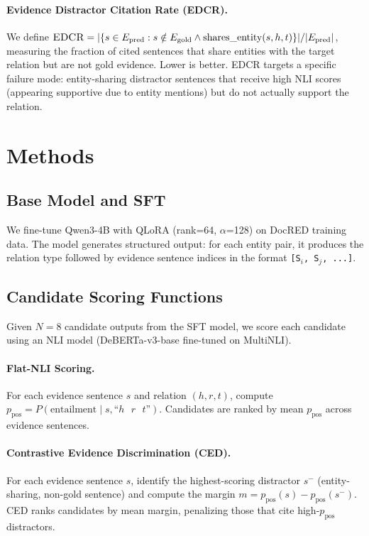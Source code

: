 \documentclass[11pt,a4paper]{article}
\newcommand{\edcr}{\textsc{EDCR}}
\begin{document}
\paragraph{Evidence Distractor Citation Rate (\edcr{}).}
We define $\edcr{} = |\{s \in E_\text{pred} : s \notin E_\text{gold} \wedge \text{shares\_entity}(s, h, t)\}| / |E_\text{pred}|$, measuring the fraction of cited sentences that share entities with the target relation but are not gold evidence. Lower is better. \edcr{} targets a specific failure mode: entity-sharing distractor sentences that receive high NLI scores (appearing supportive due to entity mentions) but do not actually support the relation.

\section{Methods}
\label{sec:methods}

\subsection{Base Model and SFT}

We fine-tune Qwen3-4B with QLoRA (rank=64, $\alpha$=128) on DocRED training data. The model generates structured output: for each entity pair, it produces the relation type followed by evidence sentence indices in the format \texttt{[S$_i$, S$_j$, ...]}.

\subsection{Candidate Scoring Functions}

Given $N{=}8$ candidate outputs from the SFT model, we score each candidate using an NLI model (DeBERTa-v3-base fine-tuned on MultiNLI).

\paragraph{Flat-NLI Scoring.}
For each evidence sentence $s$ and relation $(h, r, t)$, compute $p_\text{pos} = P(\text{entailment} \mid s, \text{``}h \text{ } r \text{ } t\text{''})$. Candidates are ranked by mean $p_\text{pos}$ across evidence sentences.

\paragraph{Contrastive Evidence Discrimination (CED).}
For each evidence sentence $s$, identify the highest-scoring distractor $s^-$ (entity-sharing, non-gold sentence) and compute the margin $m = p_\text{pos}(s) - p_\text{pos}(s^-)$. CED ranks candidates by mean margin, penalizing those that cite high-$p_\text{pos}$ distractors.
\end{document}

